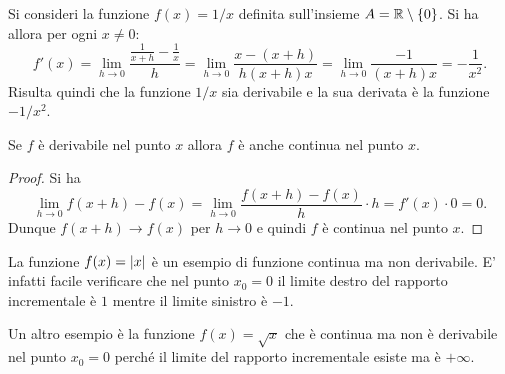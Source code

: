 \begin{example}%
\label{ex:derivata_reciproco}%
\mymark{**}%
Si consideri la funzione $f(x) = 1/x$ definita sull'insieme $A = {\mathbb R} \setminus {\left\{ 0 \right\}}$. Si ha allora per ogni $x\neq 0$:
\[
  f'(x) = \lim_{h\to 0} \frac{\frac{1}{x+h} - \frac{1}{x}}{h}
        = \lim_{h\to 0} \frac{x - (x+h)}{h(x+h)x}
        = \lim_{h\to 0} \frac{-1}{(x+h)x} = -\frac{1}{x^2}.
\]
Risulta quindi che la funzione $1/x$ sia derivabile e la sua derivata è la funzione $-1/x^2$.
\end{example}

\begin{theorem}
\mymark{***}
Se $f$ è derivabile nel punto $x$ allora $f$ è anche continua nel punto $x$.
\end{theorem}
%
\begin{proof}
\mymark{***}
Si ha
\[
  \lim_{h\to 0} f(x+h) - f(x) = \lim_{h\to 0} \frac{f(x+h) - f(x)}{h} \cdot h
  = f'(x) \cdot 0 = 0.
\]
Dunque $f(x+h)\to f(x)$ per $h\to 0$ e quindi $f$ è continua nel punto $x$.
\end{proof}

\begin{example}
\mymark{***}
La funzione $f(x) = {\left|x\right|}$ è un esempio di funzione continua ma non
derivabile. E' infatti facile verificare che nel punto $x_0=0$ il
limite destro del rapporto incrementale è $1$ mentre il limite
sinistro è $-1$.

Un altro esempio è la funzione $f(x) = \sqrt{x}$ che è continua ma non
è derivabile nel punto $x_0=0$ perché il limite del rapporto incrementale esiste ma è $+\infty$.
\end{example}



